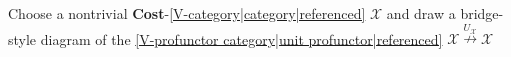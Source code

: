 
Choose a nontrivial \textbf{Cost}-\ref{V-category|category|referenced} $\mathcal{X}$ and draw a bridge-style diagram of the \ref{V-profunctor category|unit profunctor|referenced} $\mathcal{X} \overset{U_\mathcal{X}}\nrightarrow \mathcal{X}$
